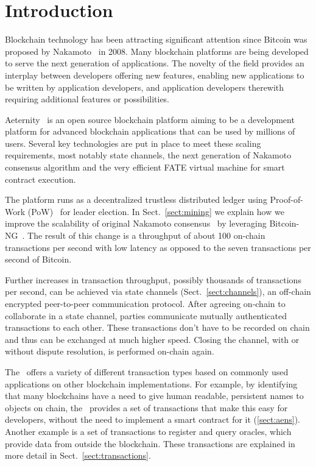 \section{Introduction}

Blockchain technology has been attracting significant attention since Bitcoin
was proposed by Nakamoto~\cite{SN} in 2008.
Many blockchain platforms are being developed to serve the next generation of
applications. The novelty of the field provides an interplay between developers
offering new features, enabling new applications to be written by application
developers, and application developers therewith requiring additional features
or possibilities.

Aeternity~\cite{AE,UlfWigerCodeMesh2018} is an open source blockchain
platform aiming to be a development platform for advanced blockchain
applications that can be used by millions of users. Several key technologies
are put in place to meet these scaling requirements, most notably state
channels, the next generation of Nakamoto consensus algorithm and the very
efficient FATE virtual machine for smart contract execution.

The platform runs as a decentralized trustless distributed ledger using
Proof-of-Work (PoW)~\cite{dwork1992pricing,back1997hashcash,Tromp2015CuckooCA}
for leader election.
In Sect.~\ref{sect:mining} we explain how we improve the scalability of
original Nakamoto consensus~\cite{SN} by leveraging
Bitcoin-NG~\cite{Eyal:2016:BSB:2930611.2930615}. The result of this change
is a throughput of about 100 on-chain transactions per second with
low latency as opposed to the seven transactions per second of Bitcoin.

Further increases in transaction throughput, possibly thousands of
transactions per second, can be achieved via state channels (Sect.~\ref{sect:channels}),
an off-chain encrypted peer-to-peer communication protocol. After
agreeing on-chain to collaborate in a state channel, parties communicate
mutually authenticated transactions to each other. These transactions don't
have to be recorded on chain and thus can be exchanged at much higher
speed. Closing the channel, with or without dispute resolution, is performed
on-chain again.

The \blockchain\ offers a variety of different transaction types
based on commonly used applications on other blockchain implementations.
For example, by identifying that many blockchains have a need to give human
readable, persistent names to objects on chain, the \blockchain\ provides a
set of transactions that make this easy for developers, without the need to
implement a smart contract for it (\ref{sect:aens}). Another example is a set
of transactions to register and query oracles, which provide data from outside
the blockchain.
These transactions are explained in more detail in Sect.~\ref{sect:transactions}.

